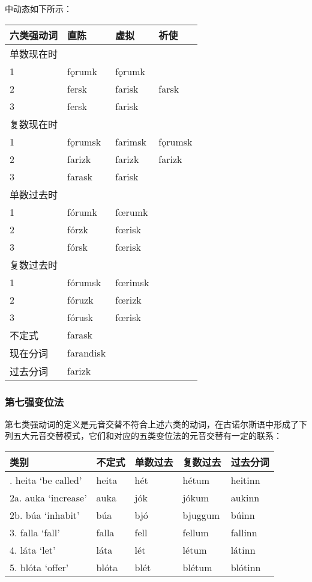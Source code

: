 中动态如下所示：

\begin{longtable}{llll}
\toprule
六类强动词 & 直陈 & 虚拟 & 祈使 \\
\midrule
\endhead
\bottomrule
\endfoot
单数现在时 & & & \\
1 & fǫrumk & fǫrumk & \\
2 & fersk & farisk & farsk \\
3 & fersk & farisk & \\
复数现在时 & & & \\
1 & fǫrumsk & farimsk & fǫrumsk \\
2 & farizk & farizk & farizk \\
3 & farask & farisk & \\
单数过去时 & & & \\
1 & fórumk & fœrumk & \\
2 & fórzk & fœrisk & \\
3 & fórsk & fœrisk & \\
复数过去时 & & & \\
1 & fórumsk & fœrimsk & \\
2 & fóruzk & fœrizk & \\
3 & fórusk & fœrisk & \\
不定式 & farask & & \\
现在分词 & farandisk & & \\
过去分词 & farizk & & \\
\end{longtable}

\subsubsection{第七强变位法}\label{ux7b2cux4e03ux5f3aux53d8ux4f4dux6cd5}

第七类强动词的定义是元音交替不符合上述六类的动词，在古诺尔斯语中形成了下列五大元音交替模式，它们和对应的五类变位法的元音交替有一定的联系：

\begin{longtable}{lllll}
\toprule
类别 & 不定式 & 单数过去 & 复数过去 & 过去分词 \\
\midrule
\endhead
\bottomrule
\endfoot
1. heita `be called‌' & heita & hét & hétum & heitinn \\
2a. auka `increase‌' & auka & jók & jókum & aukinn \\
2b. búa `inhabit‌' & búa & bjó & bjuggum & búinn \\
3. falla `fall‌' & falla & fell & fellum & fallinn \\
4. láta `let‌' & láta & lét & létum & látinn \\
5. blóta `offer‌' & blóta & blét & blétum & blótinn \\
\end{longtable}


